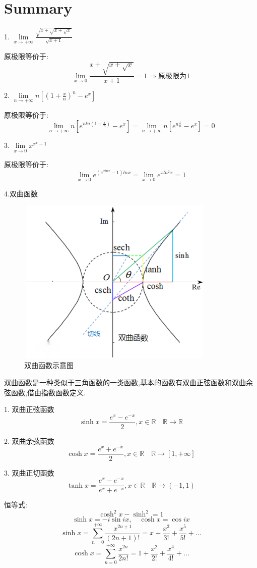 \chapter{Summary}
1. $\lim\limits_{x\rightarrow +\infty}\frac{\sqrt{x+\sqrt{x+\sqrt{x}}}}{\sqrt{x+1}}$
\begin{solution}
	
	原极限等价于:  
	$$\lim\limits_{x\rightarrow 0}\frac{x+\sqrt{x+\sqrt{x}}}{x+1}=1\Rightarrow \text{原极限为}1$$
\end{solution}
2. $\lim\limits_{n\rightarrow +\infty}n[(1+\frac{x}{n})^n-e^x]$
\begin{solution}
	
	原极限等价于:  
	$$\lim\limits_{n\rightarrow +\infty}n[e^{nln(1+\frac{x}{n})}-e^x]=\lim\limits_{n\rightarrow +\infty}n[e^{n\frac{x}{n}}-e^x]=0$$
\end{solution}
3. $\lim\limits_{x\rightarrow 0}x^{x^{x}-1}$
\begin{solution}
	
	原极限等价于:  
	$$\lim\limits_{x\rightarrow 0}e^{(e^{xlnx}-1)ln x}=\lim\limits_{x\rightarrow 0}e^{xln^2 x}=1$$
\end{solution}
4.双曲函数
\begin{figure}[htbp]
	\centering
	\includegraphics[width=9.5cm,height=8cm]{"figure/Summary/双曲函数.png"}
	\caption{双曲函数示意图}
	\label{Figure: 双曲函数示意图}
\end{figure} 
\begin{definition}\label{def: 双曲函数}
	双曲函数是一种类似于三角函数的一类函数,基本的函数有双曲正弦函数和双曲余弦函数,借由指数函数定义.
	
	1. 双曲正弦函数 
	$$\sinh x=\frac{e^{x}-e^{-x}}{2},x\in \mathbb{R}\quad \mathbb{R}\rightarrow \mathbb{R}$$
	
	2. 双曲余弦函数
	$$\cosh x=\frac{e^{x}+e^{-x}}{2},x\in \mathbb{R}\quad \mathbb{R}\rightarrow [1,+\infty]$$
	
	3. 双曲正切函数
	$$\tanh x=\frac{e^{x}-e^{-x}}{e^{x}+e^{-x}},x\in \mathbb{R}\quad \mathbb{R}\rightarrow (-1,1)$$
	
	恒等式:  
	$$\cosh^2 x-\sinh^2=1$$
	$$\sinh x=-i\sin ix,\quad \cosh x=\cos ix$$
	$$\sinh x=\sum\limits_{n=0}^{+\infty}\frac{x^{2n+1}}{(2n+1)!}=x+\frac{x^3}{3!}+\frac{x^5}{5!}+\dots$$
	$$\cosh x=\sum\limits_{n=0}^{+\infty}\frac{x^{2n}}{2n!}=1+\frac{x^2}{2!}+\frac{x^4}{4!}+\dots$$
\end{definition}
